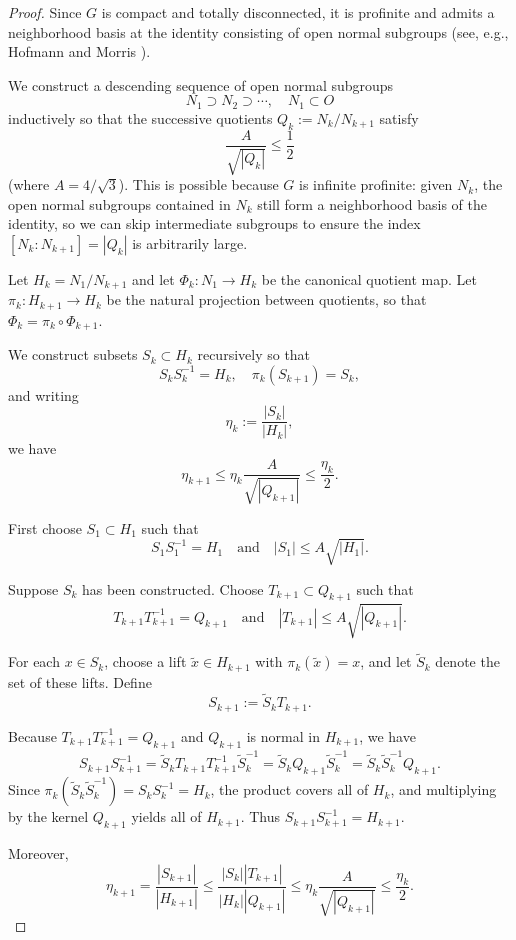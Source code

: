 \documentclass[10pt,a4paper]{amsart}
\begin{document}
\begin{proof}
Since \(G\) is compact and totally disconnected,
it is profinite and admits a neighborhood basis at the identity
consisting of open normal subgroups (see, e.g., Hofmann and Morris \cite[Theorem~1.34]{HM}).

We construct a descending sequence of open normal subgroups
\[
N_1 \supset N_2 \supset \cdots,\quad N_1 \subset O
\]
inductively so that the successive quotients \(Q_k := N_k/N_{k+1}\) satisfy
\[
\frac{A}{\sqrt{|Q_k|}} \le \frac12
\]
(where \(A=4/\sqrt{3}\)). This is possible because \(G\) is infinite profinite:
given \(N_k\), the open normal subgroups contained in \(N_k\) still form a neighborhood basis of the identity, so we can skip intermediate subgroups to ensure the index \([N_k:N_{k+1}]=|Q_k|\) is arbitrarily large.

Let \(H_k = N_1/N_{k+1}\) and let \(\Phi_k : N_1 \to H_k\) be the canonical quotient map.
Let \(\pi_k : H_{k+1} \to H_k\) be the natural projection between quotients, so that \(\Phi_k = \pi_k \circ \Phi_{k+1}\).

We construct subsets \(S_k \subset H_k\) recursively so that
\[
S_k S_k^{-1} = H_k, \quad \pi_k(S_{k+1}) = S_k,
\]
and writing
\[
\eta_k := \frac{|S_k|}{|H_k|},
\]
we have
\[
\eta_{k+1} \le \eta_k \frac{A}{\sqrt{|Q_{k+1}|}} \le \frac{\eta_k}{2}.
\]

First choose \(S_1 \subset H_1\) such that
\[
S_1 S_1^{-1} = H_1 \quad\text{and}\quad |S_1| \le A \sqrt{|H_1|}.
\]

Suppose \(S_k\) has been constructed. Choose
\(T_{k+1} \subset Q_{k+1}\) such that
\[
T_{k+1} T_{k+1}^{-1} = Q_{k+1} \quad\text{and}\quad |T_{k+1}| \le A \sqrt{|Q_{k+1}|}.
\]

For each \(x \in S_k\), choose a lift \(\tilde{x} \in H_{k+1}\)
with \(\pi_k(\tilde{x}) = x\), and let \(\tilde{S}_k\) denote
the set of these lifts. Define
\[
S_{k+1} := \tilde{S}_k T_{k+1}.
\]

Because \(T_{k+1} T_{k+1}^{-1} = Q_{k+1}\) and \(Q_{k+1}\) is normal in \(H_{k+1}\), we have
\[
S_{k+1} S_{k+1}^{-1} = \tilde{S}_k T_{k+1} T_{k+1}^{-1} \tilde{S}_k^{-1} = \tilde{S}_k Q_{k+1} \tilde{S}_k^{-1} = \tilde{S}_k \tilde{S}_k^{-1} Q_{k+1}.
\]
Since \(\pi_k(\tilde{S}_k \tilde{S}_k^{-1}) = S_k S_k^{-1} = H_k\), the product covers all of \(H_k\), and multiplying by the kernel \(Q_{k+1}\) yields all of \(H_{k+1}\). Thus \(S_{k+1} S_{k+1}^{-1} = H_{k+1}\).

Moreover,
\[
\eta_{k+1} = \frac{|S_{k+1}|}{|H_{k+1}|} \le \frac{|S_k||T_{k+1}|}{|H_k||Q_{k+1}|} \le \eta_k \frac{A}{\sqrt{|Q_{k+1}|}} \le \frac{\eta_k}{2}.
\]


\end{proof}
\end{document}
